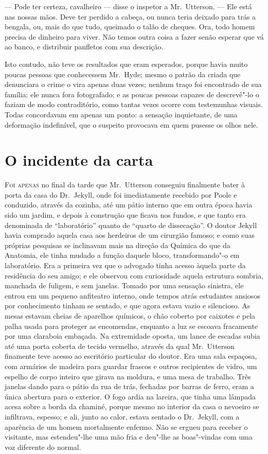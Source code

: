 --- Pode ter certeza, cavalheiro --- disse o inspetor a Mr.~Utterson. ---
Ele está nas nossas mãos.  Deve ter perdido a cabeça, ou nunca teria
deixado para trás a bengala, ou, mais do que tudo, queimado o talão de
cheques.  Ora, todo homem precisa de dinheiro para viver.  Não temos
outra coisa a fazer senão esperar que vá ao banco, e distribuir
panfletos com sua descrição.

Isto contudo, não teve os resultados que eram esperados, porque havia
muito poucas pessoas que conhecessem Mr.~Hyde; mesmo o patrão da criada
que denunciara o crime o vira apenas duas vezes; nenhum traço foi
encontrado de sua família; ele nunca fora fotografado; e as poucas
pessoas capazes de descrevê"-lo o faziam de modo contraditório, como
tantas vezes ocorre com testemunhas visuais. Todas concordavam em
apenas um ponto: a sensação inquietante, de uma deformação indefinível,
que o suspeito provocava em quem pusesse os olhos nele. 


\chapter[O incidente da carta]{O incidente da carta}

\textsc{Foi apenas} no final da tarde que Mr.~Utterson conseguiu finalmente bater
à porta da casa do Dr.~Jekyll, onde foi imediatamente recebido por
Poole e conduzido, através da cozinha, até um pátio interno que em
outra época havia sido um jardim, e depois à construção que ficava nos
fundos, e que tanto era denominada de “laboratório” quanto de “quarto
de dissecação”.  O doutor Jekyll havia comprado aquela casa aos
herdeiros de um cirurgião famoso; e como suas próprias pesquisas se
inclinavam mais na direção da Química do que da Anatomia, ele tinha
mudado a função daquele bloco, transformando"-o em laboratório.  Era a
primeira vez que o advogado tinha acesso àquela parte da residência do
seu amigo; e ele observou com curiosidade  aquela estrutura sombria,
manchada de fuligem, e sem janelas.  Tomado por uma sensação sinistra,
ele entrou em um pequeno anfiteatro interno, onde tempos atrás
estudantes ansiosos por conhecimento tinham se sentado, e que agora
estava vazio e silencioso.  As mesas estavam cheias de aparelhos
químicos, o chão coberto por caixotes e pela palha usada para proteger
as encomendas, enquanto a luz se escoava fracamente por uma claraboia
embaçada. Na extremidade oposta, um lance de escadas subia até uma
porta coberta de tecido vermelho, através da qual Mr.~Utterson
finamente teve acesso ao escritório particular do doutor.  Era uma sala
espaçosa, com armários de madeira para guardar frascos e outros
recipientes de vidro, um espelho de corpo inteiro que girava na
moldura, e uma mesa de trabalho.  Três janelas dando para o pátio da
rua de trás, fechadas por barras de ferro, eram a única abertura para o
exterior.  O fogo ardia na lareira, que tinha uma lâmpada acesa sobre a
borda da chaminé, porque mesmo no interior da casa o nevoeiro se
infiltrava, espesso; e ali, junto ao calor, estava sentado o Dr.~Jekyll, 
com a aparência de um homem mortalmente enfermo.  Não se ergueu
para receber o visitante, mas estendeu"-lhe uma mão fria e deu"-lhe as
boas"-vindas com uma voz diferente do normal.

